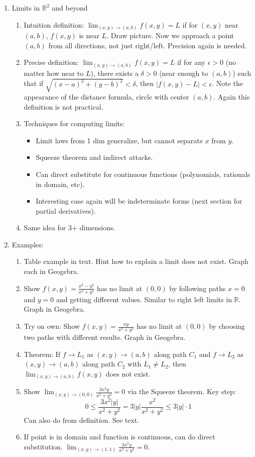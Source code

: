 \documentclass{article}
\newcommand{\ds}{\displaystyle}
\begin{document}
\begin{enumerate}
\item Limits in $\mathbb{R}^2$ and beyond
\begin{enumerate}
\item  Intuition definition: $\ds \lim_{(x,y)\rightarrow (a,b)} f(x,y) = L$ if for $(x,y)$ near $(a,b)$, $f(x,y)$ is near $L$. Draw picture. Now we approach a point $(a,b)$ from all directions, not just right/left. Precision again is needed.
\item Precise definition: $\ds \lim_{(x,y)\rightarrow (a,b)} f(x,y) = L$ if for any $\epsilon > 0$ (no matter how near to $L$), there exists a $\delta >0$ (near enough to $(a,b)$) such that if $\sqrt{(x-a)^2+(y-b)^2} < \delta$, then $|f(x,y)-L| < \epsilon$. Note the appearance of the distance formula, circle with center $(a,b)$. Again this definition is not practical.
\item Techniques for computing limits:
\begin{itemize}
\item Limit laws from 1 dim generalize, but cannot separate $x$ from $y$.
\item Squeeze theorem and indirect attacks.
\item Can direct substitute for continuous functions (polynomials, rationals in domain, etc).
\item Interesting case again will be indeterminate forms (next section for partial derivatives).
\end{itemize}
\item Same idea for 3+ dimensions.
\end{enumerate}

\item Examples:
\begin{enumerate}
\item Table example in text. Hint how to explain a limit does not exist. Graph each in Geogebra.
\item Show $f(x,y)=\frac{x^2-y^2}{x^2+y^2}$ has no limit at $(0,0)$ by following paths $x=0$ and $y=0$ and getting different values. Similar to right left limits in $\mathbb{R}$. Graph in Geogebra.
\item Try on own: Show $f(x,y)=\frac{xy}{x^2+y^2}$ has no limit at $(0,0)$ by choosing two paths with different results. Graph in Geogebra.
\item Theorem: If $f \rightarrow L_1$ as $(x,y)\rightarrow (a,b)$ along path $C_1$ and $f \rightarrow L_2$ as $(x,y)\rightarrow (a,b)$ along path $C_2$ with $L_1 \neq L_2$, then $\lim_{(x,y)\rightarrow (a,b)} f(x,y)$ does not exist.
\item Show $\lim_{(x,y)\rightarrow (0,0)} \frac{3x^2y}{x^2+y^2}=0$ via the Squeeze theorem. Key step:
\[
0 \leq \frac{3x^2|y|}{x^2+y^2} = 3|y|\frac{x^2}{x^2+y^2} \leq 3|y|\cdot 1
\]
Can also do from definition. See text.
\item If point is in domain and function is continuous, can do direct substitution.  $\lim_{(x,y)\rightarrow (1,1)} \frac{3x^2y}{x^2+y^2}=0$.
\end{enumerate}


\end{enumerate}
\end{document}
